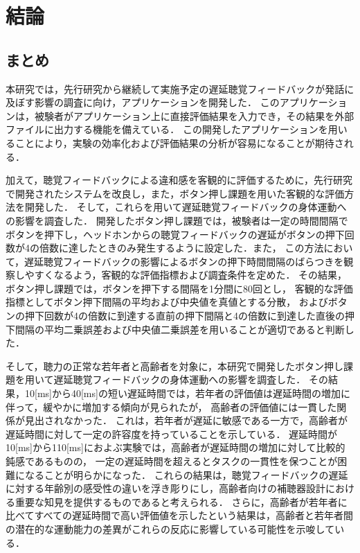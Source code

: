 \chapter{結論}
\section{まとめ}
本研究では，先行研究から継続して実施予定の遅延聴覚フィードバックが発話に及ぼす影響の調査に向け，アプリケーションを開発した．
このアプリケーションは，被験者がアプリケーション上に直接評価結果を入力でき，その結果を外部ファイルに出力する機能を備えている．
この開発したアプリケーションを用いることにより，実験の効率化および評価結果の分析が容易になることが期待される．

加えて，聴覚フィードバックによる違和感を客観的に評価するために，先行研究\cite{shigematu}で開発されたシステムを改良し，また，ボタン押し課題を用いた客観的な評価方法を開発した．
そして，これらを用いて遅延聴覚フィードバックの身体運動への影響を調査した．
開発したボタン押し課題では，被験者は一定の時間間隔でボタンを押下し，ヘッドホンからの聴覚フィードバックの遅延がボタンの押下回数が4の倍数に達したときのみ発生するように設定した．また，
この方法において，遅延聴覚フィードバックの影響によるボタンの押下時間間隔のばらつきを観察しやすくなるよう，客観的な評価指標および調査条件を定めた．
その結果，ボタン押し課題では，ボタンを押下する間隔を1分間に80回とし，
客観的な評価指標としてボタン押下間隔の平均および中央値を真値とする分散，
およびボタンの押下回数が4の倍数に到達する直前の押下間隔と4の倍数に到達した直後の押下間隔の平均二乗誤差および中央値二乗誤差を用いることが適切であると判断した．

そして，聴力の正常な若年者と高齢者を対象に，本研究で開発したボタン押し課題を用いて遅延聴覚フィードバックの身体運動への影響を調査した．
その結果，10[ms]から40[ms]の短い遅延時間では，若年者の評価値は遅延時間の増加に伴って，緩やかに増加する傾向が見られたが，
高齢者の評価値には一貫した関係が見出されなかった．
これは，若年者が遅延に敏感である一方で，高齢者が遅延時間に対して一定の許容度を持っていることを示している．
遅延時間が10[ms]から110[ms]におよぶ実験では，高齢者が遅延時間の増加に対して比較的鈍感であるものの，
一定の遅延時間を超えるとタスクの一貫性を保つことが困難になることが明らかになった．
これらの結果は，聴覚フィードバックの遅延に対する年齢別の感受性の違いを浮き彫りにし，高齢者向けの補聴器設計における重要な知見を提供するものであると考えられる．
さらに，高齢者が若年者に比べてすべての遅延時間で高い評価値を示したという結果は，高齢者と若年者間の潜在的な運動能力の差異がこれらの反応に影響している可能性を示唆している．
